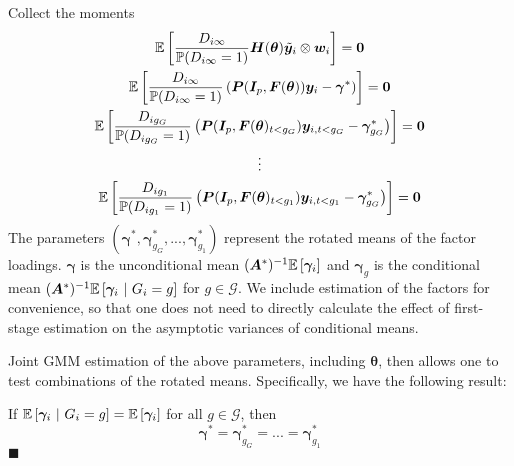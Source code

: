 \documentclass[12pt]{article}
\newcommand{\nick}[1]{\iftoggle{INCLUDECOMMENTS}{{\color{violet!70!white}\textbf{Nick:} #1}}{}}
\begin{document}
Collect the moments 
\begin{gather*}
    \mathbb{E}\left[\frac{D_{i \infty}}{\mathbb{P}(D_{i \infty} = 1)}\bm H(\bm \theta) \tilde{\bm y}_i \otimes \bm w_i\right] = \bm 0\\
    \mathbb{E}\left[\frac{D_{i \infty}}{\mathbb{P}(D_{i \infty} = 1)} \left( \bm P(\bm I_p, \bm F(\bm \theta)) \bm y_i - \bm \gamma^* \right)\right] = \bm 0\\
    \mathbb{E}\left[\frac{D_{i g_G}}{\mathbb{P}(D_{ig_G} = 1)} \left( \bm P(\bm I_p, \bm F(\bm \theta)_{t < g_G}) \bm y_{i,t < g_G} - \bm \gamma_{g_G}^* \right) \right] = \bm 0\\
    \vdots\\
    \mathbb{E}\left[\frac{D_{i g_1}}{\mathbb{P}(D_{ig_1} = 1)} \left( \bm P(\bm I_p, \bm F(\bm \theta)_{t < g_1}) \bm y_{i,t < g_1} - \bm \gamma_{g_G}^* \right) \right] = \bm 0
\end{gather*}
The parameters $(\bm \gamma^*, \bm \gamma_{g_G}^*,...,\bm \gamma_{g_1}^*)$ represent the rotated means of the factor loadings. $\bm \gamma$ is the unconditional mean $(\bm A^*)^{-1}\mathbb{E}\left[\bm \gamma_i\right]$ and $\bm \gamma_g$ is the conditional mean $(\bm A^*)^{-1}\mathbb{E}\left[\bm \gamma_i \ \vert \ G_i = g\right]$ for $g \in \mathcal{G}$. We include estimation of the factors for convenience, so that one does not need to directly calculate the effect of first-stage estimation on the asymptotic variances of conditional means. 

Joint GMM estimation of the above parameters, including $\bm \theta$, then allows one to test combinations of the rotated means. Specifically, we have the following result: \nick{Need to change the theorem reference/label}
\begin{theorem}
    If $\mathbb{E}\left[\bm \gamma_i \ \vert \ G_i = g\right] = \mathbb{E}\left[\bm \gamma_i\right]$ for all $g \in \mathcal{G}$, then
    \begin{equation}
        \bm \gamma^* = \bm \gamma_{g_G}^* = ... = \bm \gamma_{g_1}^*
    \end{equation}
    $\blacksquare$
\end{theorem}





\newpage~
\end{document}
